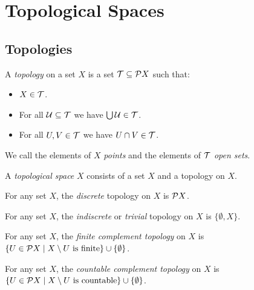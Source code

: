 \newcommand{\support}{\ensuremath{\operatorname{support}}}

\chapter{Topological Spaces}

\section{Topologies}
\begin{definition}[Topology]
    A \emph{topology} on a set $X$ is a set $\mathcal{T} \subseteq \mathcal{P} X$ such that:
    \begin{itemize}
        \item $X \in \mathcal{T}$.
        \item For all $\mathcal{U} \subseteq \mathcal{T}$ we have $\bigcup \mathcal{U} \in \mathcal{T}$.
        \item For all $U, V \in \mathcal{T}$ we have $U \cap V \in \mathcal{T}$.
    \end{itemize}
    We call the elements of $X$ \emph{points} and the elements of $\mathcal{T}$ \emph{open sets}.
\end{definition}

\begin{definition}
    A \emph{topological space} $X$ consists of a set $X$ and a topology on $X$.
\end{definition}

\begin{definition}
    For any set $X$, the \emph{discrete} topology on $X$ is $\mathcal{P} X$.
\end{definition}

\begin{definition}
    For any set $X$, the \emph{indiscrete} or \emph{trivial} topology on $X$ is $\{ \emptyset, X \}$.
\end{definition}

\begin{definition}
    For any set $X$, the \emph{finite complement topology} on $X$ is $\{ U \in \mathcal{P} X \mid X \setminus U \text{ is finite} \} 
    \cup \{ \emptyset \}$.
\end{definition}

\begin{definition}
    For any set $X$, the \emph{countable complement topology} on $X$ is $\{ U \in \mathcal{P} X \mid X \setminus U \text{ is countable} \} 
    \cup \{ \emptyset \}$.
\end{definition}

